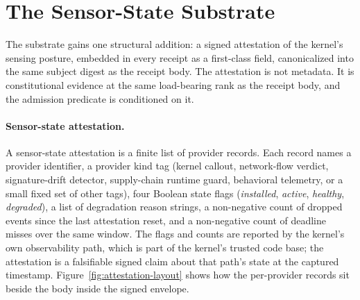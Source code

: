 \section{The Sensor-State Substrate}
\label{sec:substrate}

The substrate gains one structural addition: a signed attestation of the kernel's sensing posture, embedded in every receipt as a first-class field, canonicalized into the same subject digest as the receipt body. The attestation is not metadata. It is constitutional evidence at the same load-bearing rank as the receipt body, and the admission predicate is conditioned on it.

\paragraph{Sensor-state attestation.}
A sensor-state attestation is a finite list of provider records. Each record names a provider identifier, a provider kind tag (kernel callout, network-flow verdict, signature-drift detector, supply-chain runtime guard, behavioral telemetry, or a small fixed set of other tags), four Boolean state flags (\emph{installed}, \emph{active}, \emph{healthy}, \emph{degraded}), a list of degradation reason strings, a non-negative count of dropped events since the last attestation reset, and a non-negative count of deadline misses over the same window. The flags and counts are reported by the kernel's own observability path, which is part of the kernel's trusted code base; the attestation is a falsifiable signed claim about that path's state at the captured timestamp. Figure~\ref{fig:attestation-layout} shows how the per-provider records sit beside the body inside the signed envelope.

